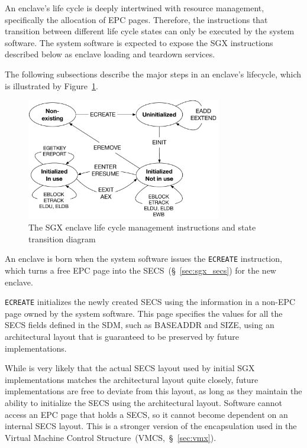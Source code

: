 \label{sec:sgx_enclave_lifecycle}

An enclave's life cycle is deeply intertwined with resource management,
specifically the allocation of EPC pages. Therefore, the instructions that
transition between different life cycle states can only be executed by the
system software. The system software is expected to expose the SGX instructions
described below as enclave loading and teardown services.

The following subsections describe the major steps in an enclave's lifecycle,
which is illustrated by Figure~\ref{fig:sgx_enclave_lifecycle}.

\begin{figure}[hbt]
  \centering
  \includegraphics[width=85mm]{figures/sgx_enclave_lifecycle.pdf}
  \caption{
    The SGX enclave life cycle management instructions and state transition
    diagram
  }
  \label{fig:sgx_enclave_lifecycle}
\end{figure}



\label{sec:sgx_ecreate}

An enclave is born when the system software issues the \texttt{ECREATE}
instruction, which turns a free EPC page into the SECS~(\S~\ref{sec:sgx_secs})
for the new enclave.

\texttt{ECREATE} initializes the newly created SECS using the information in a
non-EPC page owned by the system software. This page specifies the values for
all the SECS fields defined in the SDM, such as BASEADDR and SIZE, using an
architectural layout that is guaranteed to be preserved by future
implementations.

While is very likely that the actual SECS layout used by initial SGX
implementations matches the architectural layout quite closely, future
implementations are free to deviate from this layout, as long as they maintain
the ability to initialize the SECS using the architectural layout.
Software cannot access an EPC page that holds a SECS, so it cannot become
dependent on an internal SECS layout. This is a stronger version of the
encapsulation used in the Virtual Machine Control
Structure~(VMCS,~\S~\ref{sec:vmx}).

